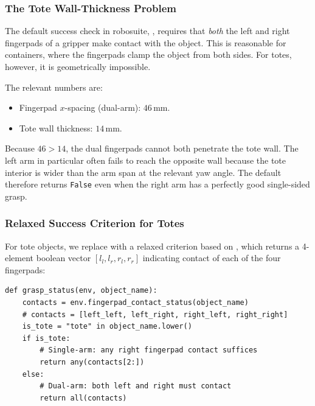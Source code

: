\subsubsection{The Tote Wall-Thickness Problem}
\label{sec:scripted_grasp:tote_wall}

The default success check in robosuite, , requires that \emph{both} the left and right fingerpads of a gripper make contact with the object. This is reasonable for containers, where the fingerpads clamp the object from both sides. For totes, however, it is geometrically impossible.

The relevant numbers are:
\begin{itemize}[leftmargin=*,itemsep=2pt]
    \item Fingerpad $x$-spacing (dual-arm): $46\,\mathrm{mm}$.
    \item Tote wall thickness: $14\,\mathrm{mm}$.
\end{itemize}

Because $46 > 14$, the dual fingerpads cannot both penetrate the tote wall. The left arm in particular often fails to reach the opposite wall because the tote interior is wider than the arm span at the relevant yaw angle. The default  therefore returns \texttt{False} even when the right arm has a perfectly good single-sided grasp.

\subsubsection{Relaxed Success Criterion for Totes}
\label{sec:scripted_grasp:relaxed}

For tote objects, we replace  with a relaxed criterion based on , which returns a 4-element boolean vector $[l_l, l_r, r_l, r_r]$ indicating contact of each of the four fingerpads:

\begin{lstlisting}[caption={Object-type-aware grasp success check.}]
def grasp_status(env, object_name):
    contacts = env.fingerpad_contact_status(object_name)
    # contacts = [left_left, left_right, right_left, right_right]
    is_tote = "tote" in object_name.lower()
    if is_tote:
        # Single-arm: any right fingerpad contact suffices
        return any(contacts[2:])
    else:
        # Dual-arm: both left and right must contact
        return all(contacts)
\end{lstlisting}

